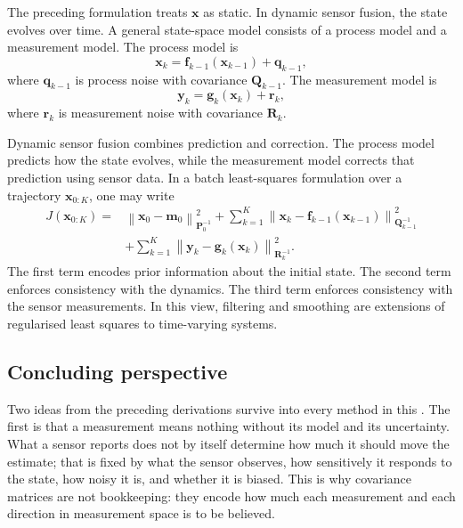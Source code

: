 The preceding formulation treats $\mathbf{x}$ as static. In dynamic sensor fusion, the state evolves over time. A general state-space model consists of a process model and a measurement model. The process model is
\begin{equation}
\mathbf{x}_k
=
\mathbf{f}_{k-1}
\left(
\mathbf{x}_{k-1}
\right)
+
\mathbf{q}_{k-1},
\end{equation}
where $\mathbf{q}_{k-1}$ is process noise with covariance $\mathbf{Q}_{k-1}$. The measurement model is
\begin{equation}
\mathbf{y}_k
=
\mathbf{g}_k
\left(
\mathbf{x}_k
\right)
+
\mathbf{r}_k,
\end{equation}
where $\mathbf{r}_k$ is measurement noise with covariance $\mathbf{R}_k$.

Dynamic sensor fusion combines prediction and correction. The process model predicts how the state evolves, while the measurement model corrects that prediction using sensor data. In a batch least-squares formulation over a trajectory $\mathbf{x}_{0:K}$, one may write
\begin{align}
J(\mathbf{x}_{0:K})
=&
\left\|
\mathbf{x}_0
-
\mathbf{m}_0
\right\|_{\mathbf{P}_0^{-1}}^2
+
\sum_{k=1}^{K}
\left\|
\mathbf{x}_k
-
\mathbf{f}_{k-1}
\left(
\mathbf{x}_{k-1}
\right)
\right\|_{\mathbf{Q}_{k-1}^{-1}}^2 \nonumber \\
&+
\sum_{k=1}^{K}
\left\|
\mathbf{y}_k
-
\mathbf{g}_k
\left(
\mathbf{x}_k
\right)
\right\|_{\mathbf{R}_k^{-1}}^2.
\end{align}
The first term encodes prior information about the initial state. The second term enforces consistency with the dynamics. The third term enforces consistency with the sensor measurements. In this view, filtering and smoothing are extensions of regularised least squares to time-varying systems.



\subsection{Concluding perspective}

Two ideas from the preceding derivations survive into every method in this . The first is that a measurement means nothing without its model and its uncertainty. What a sensor reports does not by itself determine how much it should move the estimate; that is fixed by what the sensor observes, how sensitively it responds to the state, how noisy it is, and whether it is biased. This is why covariance matrices are not bookkeeping: they encode how much each measurement and each direction in measurement space is to be believed.

